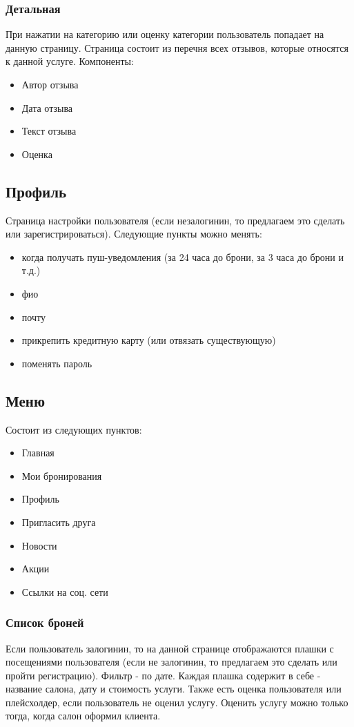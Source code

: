 \documentclass[DIV=calc, paper=a4, fontsize=11pt]{scrartcl} %
\begin{document}
\subsubsection{Детальная}
При нажатии на категорию или оценку категории пользователь попадает на данную страницу. Страница состоит из перечня всех отзывов, которые относятся к данной услуге. Компоненты:

\begin{itemize}
	\item Автор отзыва
	\item Дата отзыва
	\item Текст отзыва
	\item Оценка 
\end{itemize}

\subsection{Профиль}
Страница настройки пользователя (если незалогинин, то предлагаем это сделать или зарегистрироваться). Следующие пункты можно менять:

\begin{itemize}
	\item когда получать пуш-уведомления (за 24 часа до брони, за 3 часа до брони и т.д.)
	\item фио
	\item почту
	\item прикрепить кредитную карту (или отвязать существующую)
	\item поменять пароль
\end{itemize}

\subsection{Меню}
Состоит из следующих пунктов:

\begin{itemize}
	\item Главная
	\item Мои бронирования
	\item Профиль
	\item Пригласить друга
	\item Новости
	\item Акции
	\item Ссылки на соц. сети
\end{itemize}

\subsubsection{Список броней}
Если пользователь залогинин, то на данной странице отображаются плашки с посещениями пользователя (если не залогинин, то предлагаем это сделать или пройти регистрацию). Фильтр - по дате.
Каждая плашка содержит в себе - название салона, дату и стоимость услуги. Также есть оценка пользователя или плейсхолдер, если пользователь не оценил услугу. Оценить услугу можно только тогда, когда салон оформил клиента.
\end{document}
